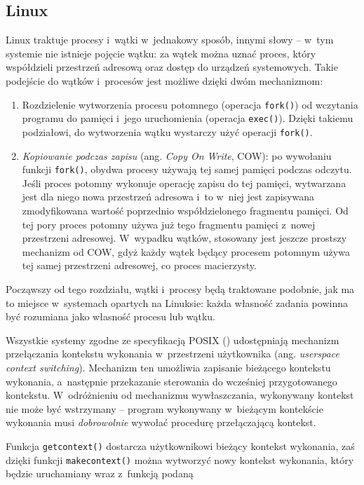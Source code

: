 \documentclass[12pt]{mwart}
\newcommand{\code}{\texttt}
\newcommand{\procbr}{()}
\newcommand{\function}[1]{\code{#1\procbr}}
\begin{document}
\subsection{Linux}
\indent
  Linux traktuje procesy i~wątki w~jednakowy sposób, innymi słowy -- w~tym systemie nie istnieje pojęcie wątku: za wątek można uznać proces, który
  współdzieli przestrzeń adresową oraz dostęp do urządzeń systemowych.
  Takie podejście do wątków i~procesów jest możliwe dzięki dwóm mechanizmom:
  \begin{enumerate}
    \item Rozdzielenie wytworzenia procesu potomnego (operacja \function{fork}) od wczytania programu do pamięci i~jego uruchomienia (operacja \function{exec}).
    Dzięki takiemu podziałowi, do wytworzenia wątku wystarczy użyć operacji \function{fork}.
    \item \emph{Kopiowanie podczas zapisu} (ang. \emph{Copy On Write}, COW): po wywołaniu funkcji \function{fork}, obydwa procesy używają
    tej samej pamięci podczas odczytu. Jeśli proces potomny wykonuje operację zapisu do tej pamięci, wytwarzana jest dla niego nowa przestrzeń adresowa
    i~to w~niej jest zapisywana zmodyfikowana wartość poprzednio współdzielonego fragmentu pamięci. Od tej pory proces potomny używa już tego fragmentu pamięci 
    z~nowej przestrzeni adresowej. W~wypadku wątków, stosowany jest jeszcze prostszy mechanizm od COW, gdyż każdy wątek będący procesem potomnym używa tej samej
    przestrzeni adresowej, co proces macierzysty.
  \end{enumerate}
  Począwszy od tego rozdziału, wątki i~procesy będą traktowane podobnie, jak ma to miejsce w~systemach opartych na Linuksie: każda własność zadania powinna być
  rozumiana jako własność procesu lub wątku.
\par
%
\indent
  Wszystkie systemy zgodne ze specyfikacją POSIX (\cite{POSIX}) udostępniają mechanizm przełączania kontekstu wykonania w~przestrzeni użytkownika (ang. \emph{user\dywiz space context switching}).
  Mechanizm ten umożliwia zapisanie bieżącego kontekstu wykonania, a~następnie przekazanie sterowania do wcześniej przygotowanego kontekstu. W~odróżnieniu od mechanizmu wywłaszczania,
  wykonywany kontekst nie może być wstrzymany -- program wykonywany w~bieżącym kontekście wykonania musi \emph{dobrowolnie} wywołać procedurę przełączającą kontekst.
\par
%
\indent
  Funkcja \function{getcontext} dostarcza użytkownikowi bieżący kontekst wykonania, zaś dzięki funkcji \function{makecontext} można wytworzyć nowy kontekst wykonania, który będzie uruchamiany wraz z~funkcją podaną
\end{document}

